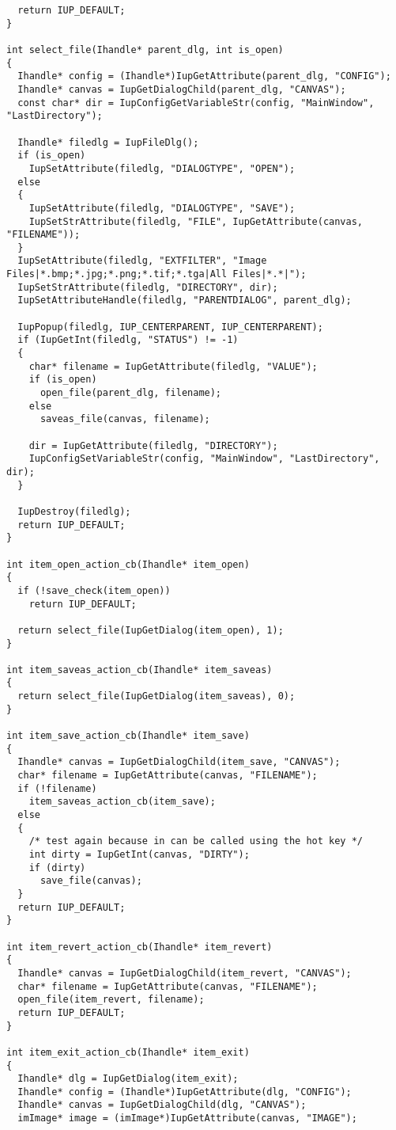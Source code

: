 \documentclass{ctexart}
\begin{document}
\begin{lstlisting}
  return IUP_DEFAULT;
}

int select_file(Ihandle* parent_dlg, int is_open)
{
  Ihandle* config = (Ihandle*)IupGetAttribute(parent_dlg, "CONFIG");
  Ihandle* canvas = IupGetDialogChild(parent_dlg, "CANVAS");
  const char* dir = IupConfigGetVariableStr(config, "MainWindow", "LastDirectory");

  Ihandle* filedlg = IupFileDlg();
  if (is_open)
    IupSetAttribute(filedlg, "DIALOGTYPE", "OPEN");
  else
  {
    IupSetAttribute(filedlg, "DIALOGTYPE", "SAVE");
    IupSetStrAttribute(filedlg, "FILE", IupGetAttribute(canvas, "FILENAME"));
  }
  IupSetAttribute(filedlg, "EXTFILTER", "Image Files|*.bmp;*.jpg;*.png;*.tif;*.tga|All Files|*.*|");
  IupSetStrAttribute(filedlg, "DIRECTORY", dir);
  IupSetAttributeHandle(filedlg, "PARENTDIALOG", parent_dlg);

  IupPopup(filedlg, IUP_CENTERPARENT, IUP_CENTERPARENT);
  if (IupGetInt(filedlg, "STATUS") != -1)
  {
    char* filename = IupGetAttribute(filedlg, "VALUE");
    if (is_open)
      open_file(parent_dlg, filename);
    else
      saveas_file(canvas, filename);

    dir = IupGetAttribute(filedlg, "DIRECTORY");
    IupConfigSetVariableStr(config, "MainWindow", "LastDirectory", dir);
  }

  IupDestroy(filedlg);
  return IUP_DEFAULT;
}

int item_open_action_cb(Ihandle* item_open)
{
  if (!save_check(item_open))
    return IUP_DEFAULT;

  return select_file(IupGetDialog(item_open), 1);
}

int item_saveas_action_cb(Ihandle* item_saveas)
{
  return select_file(IupGetDialog(item_saveas), 0);
}

int item_save_action_cb(Ihandle* item_save)
{
  Ihandle* canvas = IupGetDialogChild(item_save, "CANVAS");
  char* filename = IupGetAttribute(canvas, "FILENAME");
  if (!filename)
    item_saveas_action_cb(item_save);
  else   
  {
    /* test again because in can be called using the hot key */
    int dirty = IupGetInt(canvas, "DIRTY");
    if (dirty)
      save_file(canvas);
  }
  return IUP_DEFAULT;
}

int item_revert_action_cb(Ihandle* item_revert)
{
  Ihandle* canvas = IupGetDialogChild(item_revert, "CANVAS");
  char* filename = IupGetAttribute(canvas, "FILENAME");
  open_file(item_revert, filename);
  return IUP_DEFAULT;
}

int item_exit_action_cb(Ihandle* item_exit)
{
  Ihandle* dlg = IupGetDialog(item_exit);
  Ihandle* config = (Ihandle*)IupGetAttribute(dlg, "CONFIG");
  Ihandle* canvas = IupGetDialogChild(dlg, "CANVAS");
  imImage* image = (imImage*)IupGetAttribute(canvas, "IMAGE");


\end{lstlisting}
\end{document}
